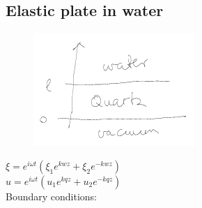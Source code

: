 \documentclass[9pt]{article}
\begin{document}
\begin{multicols}{2}
\subsection{Elastic plate in water}
	\begin{figure}
			\includegraphics[width = 0.9\linewidth]{Images/plate.png}
		\end{figure}
		$\xi=e^{i\omega t}(\xi_1e^{kwz}+\xi_2e^{-kwz})$\\
		$u=e^{i\omega t}(u_1e^{kqz}+u_2e^{-kqz})$\\
		Boundary conditions:\\

\end{multicols}
\end{document}
